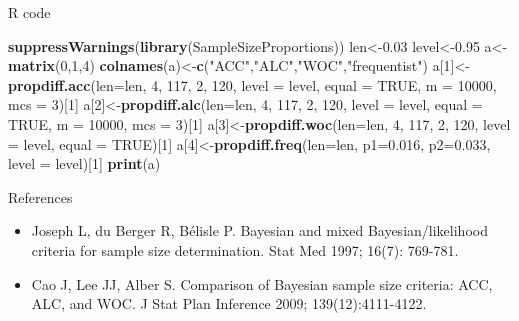 \documentclass{beamer}
\newenvironment{Shaded}{}{}
\newcommand{\KeywordTok}[1]{\textcolor[rgb]{0.00,0.44,0.13}{\textbf{{#1}}}}
\newcommand{\DataTypeTok}[1]{\textcolor[rgb]{0.56,0.13,0.00}{{#1}}}
\newcommand{\DecValTok}[1]{\textcolor[rgb]{0.25,0.63,0.44}{{#1}}}
\newcommand{\FloatTok}[1]{\textcolor[rgb]{0.25,0.63,0.44}{{#1}}}
\newcommand{\StringTok}[1]{\textcolor[rgb]{0.25,0.44,0.63}{{#1}}}
\newcommand{\OtherTok}[1]{\textcolor[rgb]{0.00,0.44,0.13}{{#1}}}
\newcommand{\NormalTok}[1]{{#1}}
\begin{document}
\begin{frame}[fragile]{R code}

\begin{Shaded}
\begin{Highlighting}[]
\KeywordTok{suppressWarnings}\NormalTok{(}\KeywordTok{library}\NormalTok{(SampleSizeProportions))}
\NormalTok{len<-}\FloatTok{0.03}
\NormalTok{level<-}\FloatTok{0.95}
\NormalTok{a<-}\KeywordTok{matrix}\NormalTok{(}\DecValTok{0}\NormalTok{,}\DecValTok{1}\NormalTok{,}\DecValTok{4}\NormalTok{)}
\KeywordTok{colnames}\NormalTok{(a)<-}\KeywordTok{c}\NormalTok{(}\StringTok{"ACC"}\NormalTok{,}\StringTok{"ALC"}\NormalTok{,}\StringTok{"WOC"}\NormalTok{,}\StringTok{"frequentist"}\NormalTok{)}
\NormalTok{a[}\DecValTok{1}\NormalTok{]<-}\KeywordTok{propdiff.acc}\NormalTok{(}\DataTypeTok{len=}\NormalTok{len, }\DecValTok{4}\NormalTok{, }\DecValTok{117}\NormalTok{, }\DecValTok{2}\NormalTok{, }\DecValTok{120}\NormalTok{, }\DataTypeTok{level =} \NormalTok{level, }\DataTypeTok{equal =} \OtherTok{TRUE}\NormalTok{, }\DataTypeTok{m =} \DecValTok{10000}\NormalTok{, }\DataTypeTok{mcs =} \DecValTok{3}\NormalTok{)[}\DecValTok{1}\NormalTok{]}
\NormalTok{a[}\DecValTok{2}\NormalTok{]<-}\KeywordTok{propdiff.alc}\NormalTok{(}\DataTypeTok{len=}\NormalTok{len, }\DecValTok{4}\NormalTok{, }\DecValTok{117}\NormalTok{, }\DecValTok{2}\NormalTok{, }\DecValTok{120}\NormalTok{, }\DataTypeTok{level =} \NormalTok{level, }\DataTypeTok{equal =} \OtherTok{TRUE}\NormalTok{, }\DataTypeTok{m =} \DecValTok{10000}\NormalTok{, }\DataTypeTok{mcs =} \DecValTok{3}\NormalTok{)[}\DecValTok{1}\NormalTok{]}
\NormalTok{a[}\DecValTok{3}\NormalTok{]<-}\KeywordTok{propdiff.woc}\NormalTok{(}\DataTypeTok{len=}\NormalTok{len, }\DecValTok{4}\NormalTok{, }\DecValTok{117}\NormalTok{, }\DecValTok{2}\NormalTok{, }\DecValTok{120}\NormalTok{, }\DataTypeTok{level =} \NormalTok{level, }\DataTypeTok{equal =} \OtherTok{TRUE}\NormalTok{)[}\DecValTok{1}\NormalTok{]}
\NormalTok{a[}\DecValTok{4}\NormalTok{]<-}\KeywordTok{propdiff.freq}\NormalTok{(}\DataTypeTok{len=}\NormalTok{len, }\DataTypeTok{p1=}\FloatTok{0.016}\NormalTok{, }\DataTypeTok{p2=}\FloatTok{0.033}\NormalTok{, }\DataTypeTok{level =} \NormalTok{level)[}\DecValTok{1}\NormalTok{]}
\KeywordTok{print}\NormalTok{(a)}
\end{Highlighting}
\end{Shaded}

\end{frame}

\begin{frame}{References}

\begin{itemize}
\item
  Joseph L, du Berger R, Bélisle P. Bayesian and mixed
  Bayesian/likelihood criteria for sample size determination. Stat Med
  1997; 16(7): 769-781.
\item
  Cao J, Lee JJ, Alber S. Comparison of Bayesian sample size criteria:
  ACC, ALC, and WOC. J Stat Plan Inference 2009; 139(12):4111-4122.
\end{itemize}

\end{frame}
\end{document}
